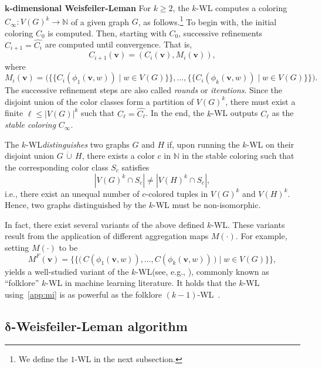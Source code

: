 \documentclass{article}
\newcommand{\xhdr}[1]{{\noindent\bfseries #1}}
\theoremstyle{definition}
\newcommand{\new}[1]{\emph{#1}}
\renewcommand{\vec}[1]{\mathbf{#1}}
\newcommand{\kwl}{$k$-\textsf{WL}\xspace}
\begin{document}
\xhdr{$\boldsymbol{k}$-dimensional Weisfeiler-Leman}\label{wl_app} For $k\geq 2$, the \kwl computes a coloring $C_\infty \colon V(G)^k \to \mathbb{N}$ of a given graph $G$, as follows.\footnote{We define the $1$-\textsf{WL} in the next subsection.} To begin with, the initial coloring $C_0$ is computed. Then, starting with $C_0$, successive refinements $C_{i+1} = \widehat{C_i}$ are computed until convergence. That is,
\[
C_{i+1}(\vec{v}) = (C_i(\vec{v}), M_i(\vec{v})),
\]
where 
\begin{equation}\label{app:mi}
M_i(\vec{v}) =   \big( \{\!\! \{  C_i(\phi_1(\vec{v},w)) \mid w \in V(G) \} \!\!\}, \dots, \{\!\! \{  C_i(\phi_k(\vec{v},w)) \mid w \in V(G) \} \!\!\} \big).
\end{equation}
The successive refinement steps are also called \new{rounds} or \new{iterations}. Since the disjoint union of the color classes form a partition of $V(G)^k$, there must exist a finite $\ell \leq |V(G)|^k$ such that $C_{\ell} = \widehat{C_{\ell}}$. In the end, the \kwl outputs $C_\ell$ as the \emph{stable coloring} $C_\infty$. 

The \kwl \new{distinguishes} two graphs $G$ and $H$ if, upon running the \kwl on their disjoint union $G \,\dot\cup\, H$, there exists a color $c$ in $\mathbb{N}$ in the stable coloring such that the corresponding color class $S_c$ satisfies
\begin{equation*}
|V(G)^k \cap S_c| \neq |V(H)^k \cap S_c|,
\end{equation*}
i.e., there exist an unequal number of $c$-colored tuples in $V(G)^k$ and $V(H)^k$. Hence, two graphs distinguished by the \kwl must be non-isomorphic. 

In fact, there exist several variants of the above defined \kwl. These variants result from the application of different aggregation maps $M(\cdot)$. For example, setting $M(\cdot)$ to be 
\begin{equation*}
M^F(\vec{v}) =  \{\!\! \{ \big( \,C(\phi_1(\vec{v},w)) , \dots,   C(\phi_k(\vec{v},w)) \,\big)  \mid w \in V(G) \} \!\!\},
\end{equation*}
yields a well-studied variant of the \kwl (see, e.g., \cite{Cai+1992}), commonly known as ``folklore'' \kwl in machine learning literature. It holds that the $k$-WL using~\cref{app:mi} is as powerful as the folklore $(k\!-\!1)$-WL~\cite{GroheO15}.

\subsection{$\boldsymbol{\delta}$-Weisfeiler-Leman algorithm} 
\end{document}
